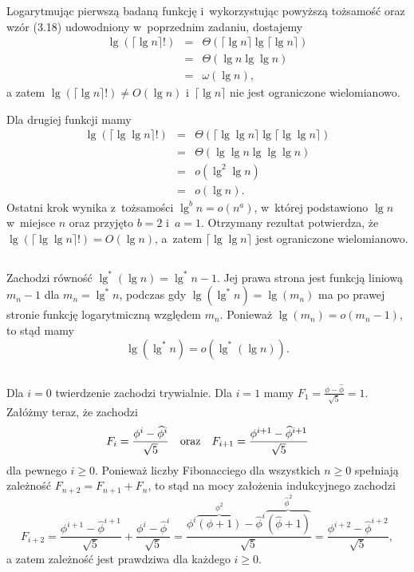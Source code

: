 Logarytmując pierwszą badaną funkcję i~wykorzystując powyższą tożsamość oraz wzór (3.18) udowodniony w~poprzednim zadaniu, dostajemy
\begin{eqnarray*}
	\lg(\lceil\lg n\rceil!) &=& \Theta(\lceil\lg n\rceil\lg\lceil\lg n\rceil) \\
	&=& \Theta(\lg n\lg\lg n) \\
	&=& \omega(\lg n),
\end{eqnarray*}
a zatem $\lg(\lceil\lg n\rceil!)\ne O(\lg n)$ i~$\lceil\lg n\rceil$ nie jest ograniczone wielomianowo.

Dla drugiej funkcji mamy
\begin{eqnarray*}
	\lg(\lceil\lg\lg n\rceil!) &=& \Theta(\lceil\lg\lg n\rceil\lg\lceil\lg\lg n\rceil) \\
	&=& \Theta(\lg\lg n\lg\lg\lg n) \\
	&=& o(\lg^2\lg n) \\
	&=& o(\lg n).
\end{eqnarray*}
Ostatni krok wynika z~tożsamości $\lg^bn=o(n^a)$, w~której podstawiono $\lg n$ w~miejsce $n$ oraz przyjęto $b=2$ i~$a=1$. Otrzymany rezultat potwierdza, że $\lg(\lceil\lg\lg n\rceil!)=O(\lg n)$, a~zatem $\lceil\lg\lg n\rceil$ jest ograniczone wielomianowo.

\subsection{} %
Zachodzi równość $\lg^*(\lg n)=\lg^*n-1$. Jej prawa strona jest funkcją liniową $m_n-1$ dla $m_n=\lg^*n$, podczas gdy $\lg(\lg^*n) = \lg(m_n)$ ma po prawej stronie funkcję logarytmiczną względem $m_n$. Ponieważ $\lg(m_n)=o(m_n-1)$, to stąd mamy
\[
	\lg(\lg^*n) = o(\lg^*(\lg n)).
\]

\subsection{} %
Dla $i=0$ twierdzenie zachodzi trywialnie. Dla $i=1$ mamy $F_1=\frac{\phi-\widehat\phi}{\sqrt{5}}=1$. Załóżmy teraz, że zachodzi
\[
	F_i = \frac{\phi^i-\widehat\phi^i}{\sqrt{5}} \quad\hbox{oraz}\quad F_{i+1} = \frac{\phi^{i+1}-\widehat\phi^{i+1}}{\sqrt{5}}
\]
dla pewnego $i\ge0$. Ponieważ liczby Fibonacciego dla wszystkich $n\ge0$ spełniają zależność $F_{n+2}=F_{n+1}+F_n$, to stąd na mocy założenia indukcyjnego zachodzi
\[
	F_{i+2} = \frac{\phi^{i+1}-\widehat\phi^{i+1}}{\sqrt{5}}+\frac{\phi^i-\widehat\phi^i}{\sqrt{5}} = \frac{\phi^i\overbrace{(\phi+1)}^{\phi^2}-\widehat\phi^i\overbrace{\left(\widehat\phi+1\right)}^{\widehat\phi^2}}{\sqrt{5}} = \frac{\phi^{i+2}-\widehat\phi^{i+2}}{\sqrt{5}},
\]
a zatem zależność jest prawdziwa dla każdego $i\ge0$.

